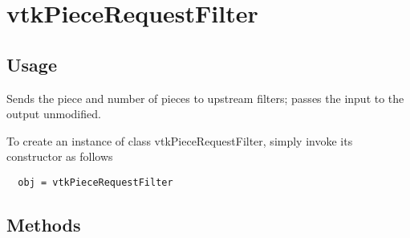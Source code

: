 \section{vtkPieceRequestFilter}

\subsection{Usage}

 Sends the piece and number of pieces to upstream filters; passes the input
 to the output unmodified.

To create an instance of class vtkPieceRequestFilter, simply
invoke its constructor as follows
\begin{verbatim}
  obj = vtkPieceRequestFilter
\end{verbatim}
\subsection{Methods}

